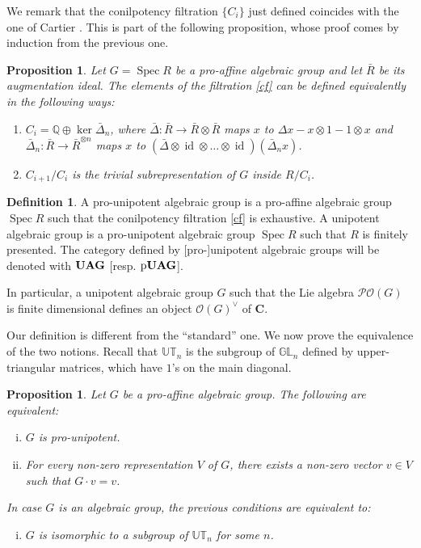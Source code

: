 \documentclass{amsart}
\newtheorem{prop}[thm]{Proposition}
\theoremstyle{definition}
\newtheorem{dfn}[thm]{Definition}
\theoremstyle{remark}
\theoremstyle{remark}
\newcommand{\Q}{\mathbb{Q}}
\newcommand{\GL}{\mathbb{GL}}
\newcommand{\cat}{\mathbf{C}}%
\newcommand{\ra}{\rightarrow}
\newcommand{\mcO}{\mathcal{O}}
\newcommand{\mcP}{\mathcal{P}}
\DeclareMathOperator{\id}{id}
\DeclareMathOperator{\Spec}{Spec}
\DeclareMathOperator{\pUAG}{p\bf{UAG}}
\DeclareMathOperator{\UAG}{\bf{UAG}}
\begin{document}
We remark that the conilpotency filtration $\{C_i\}$ just defined coincides with the one of Cartier \cite[3.8 (A)]{cartier-ha}. This is part of the following proposition, whose proof comes by induction from the previous one.
\begin{prop}
Let $G=\Spec R$ be a pro-affine algebraic group and let $\bar{R}$ be its augmentation ideal.
The elements of the filtration \eqref{cf} can be defined equivalently in the following ways:
\begin{enumerate}
	\item $C_i=\Q\oplus\ker\bar{\Delta}_n$, where $\bar{\Delta}\colon \bar{R}\ra \bar{R}\otimes \bar{R}$ maps  $x$ to $\Delta x-x\otimes1-1\otimes x$ and $\bar{\Delta}_n\colon \bar{R}\ra \bar{R}^{\otimes n}$ maps $x$ to $(\bar{\Delta}\otimes\id\otimes\ldots\otimes\id)(\bar{\Delta}_nx)$.
	\item $C_{i+1}/C_i$ is the trivial subrepresentation of $G$ inside $R/C_i$.
\end{enumerate}
\end{prop}

\begin{dfn}
A pro-unipotent algebraic group is a pro-affine algebraic group $\Spec R$ such that the conilpotency filtration \eqref{cf} is exhaustive.
A unipotent algebraic group is a pro-unipotent algebraic group $\Spec R$ such that $R$ is finitely presented. The category defined by [pro-]unipotent algebraic groups will be denoted with $\UAG$ [resp. $\pUAG$].
\end{dfn} 

In particular, a unipotent algebraic group $G$ such that the Lie algebra $\mcP\mcO(G)$ is finite dimensional defines an object $\mcO(G)^\vee$ of $\cat$.

Our definition is different from the ``standard'' one. We now prove the equivalence of the two notions. Recall that $\mathbb{UT}_n$ is the subgroup of $\GL_n$ defined by upper-triangular matrices, which have $1$'s on the main diagonal. 

\begin{prop}
Let $G$ be a pro-affine algebraic group. The following are equivalent:
\begin{enumerate}[(i)]
	\item $G$ is pro-unipotent.
	\item For every non-zero representation $V$ of $G$, there exists a non-zero vector $v\in V$ such that $G\cdot v=v$.
\end{enumerate}
In case $G$ is an algebraic group, the previous conditions are equivalent to:
\begin{enumerate}[(iii)]
	\item $G$ is isomorphic to a subgroup of $\mathbb{UT}_n$ for some $n$.
\end{enumerate}
\end{prop}
\end{document}
